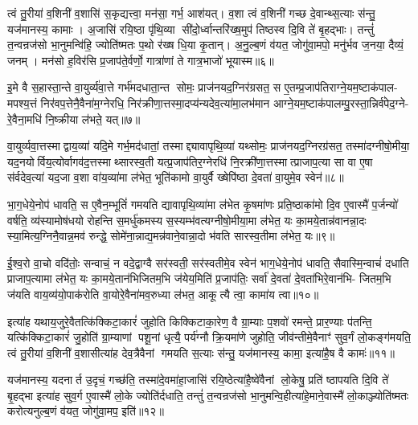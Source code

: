 त्वं तु॒रीया॑ व॒शिनी॑ व॒शासि॑ स॒कृद्यत्त्वा॒ मन॑सा॒ गर्भ॒ आश॑यत्। व॒शा त्वं व॒शिनी॑ गच्छ दे॒वान्थ्स॒त्याः स॑न्तु॒ यज॑मानस्य॒ कामाः। अ॒जासि॑ रयि॒ष्ठा पृ॑थि॒व्या सी॑दो॒र्ध्वान्तरि॑ख्ष॒मुप॑ तिष्ठस्व दि॒वि ते॑ बृ॒हद्भाः। तन्तुं॑ त॒न्वन्रज॑सो भा॒नुमन्वि॑हि॒ ज्योति॑ष्मतः प॒थो र॑ख्ष धि॒या कृ॒तान्। अ॒नु॒ल्ब॒णं व॑यत॒ जोगु॑वा॒मपो॒ मनु॑र्भव ज॒नया॒ दैव्यं॒ जनम्। मन॑सो ह॒विर॑सि प्र॒जाप॑ते॒र्वर्णो॒ गात्रा॑णां ते गात्र॒भाजो॑ भूयास्म॥६॥

{\anuvakamend[{सर॑स्वत्यै॒ स्वाहा॒ मनु॒स्त्रयो॑दश च॥२॥}]}

इ॒मे वै स॒हास्ता॒न्ते वा॒युर्व्य॑वा॒त्ते गर्भ॑मदधाता॒न्त सोमः॒ प्राज॑नयद॒ग्निर॑ग्रसत॒ स ए॒तम्प्र॒जाप॑तिराग्ने॒यम॒ष्टाक॑पाल- मपश्य॒त्तं निर॑वप॒त्तेनै॒वैना॑म॒ग्नेरधि॒ निर॑क्रीणा॒त्तस्मा॒दप्य॑न्यदेव॒त्या॑मा॒लभ॑मान आग्ने॒यम॒ष्टाक॑पालम्पु॒रस्ता॒न्निर्व॑पेद॒ग्ने- रे॒वैना॒मधि॑ नि॒ष्क्रीया ल॑भते॒ यत्॥७॥

वा॒युर्व्यवा॒त्तस्माद्वाय॒व्या॑ यदि॒मे गर्भ॒मद॑धातां॒ तस्माद्द्यावापृथि॒व्या॑ यथ्सोमः॒ प्राज॑नयद॒ग्निरग्र॑सत॒ तस्मा॑दग्नीषो॒मीया॒ यद॒नयोर्विय॒त्योर्वागव॑द॒त्तस्माथ्सारस्व॒ती यत्प्र॒जाप॑तिर॒ग्नेरधि॑ नि॒रक्री॑णा॒त्तस्मात्प्राजाप॒त्या सा वा ए॒षा स॑र्वदेव॒त्या॑ यद॒जा व॒शा वा॑य॒व्या॑मा ल॑भेत॒ भूति॑कामो वा॒युर्वै ख्षेपि॑ष्ठा दे॒वता॑ वा॒युमे॒व स्वेन॑॥८॥

भा॒ग॒धेये॒नोप॑ धावति॒ स ए॒वैन॒म्भूतिं॑ गमयति द्यावापृथि॒व्या॑मा ल॑भेत कृ॒षमा॑णः प्रति॒ष्ठाका॑मो दि॒व ए॒वास्मै॑ प॒र्जन्यो॑ वर्\mbox{}षति॒ व्य॑स्यामोष॑धयो रोहन्ति स॒मर्धु॑कमस्य स॒स्यम्भ॑वत्यग्नीषो॒मीया॒मा ल॑भेत॒ यः का॒मये॒तान्न॑वानन्ना॒दः स्या॒मित्य॒ग्निनै॒वान्न॒मव॑ रुन्द्धे॒ सोमे॑ना॒न्नाद्य॒मन्न॑वाने॒वान्ना॒दो भ॑वति सारस्व॒तीमा ल॑भेत॒ यः॥९॥

ई॒श्व॒रो वा॒चो वदि॑तोः॒ सन्वाचं॒ न वदे॒द्वाग्वै सर॑स्वती॒ सर॑स्वतीमे॒व स्वेन॑ भाग॒धेये॒नोप॑ धावति॒ सैवास्मि॒न्वाचं॑ दधाति प्राजाप॒त्यामा ल॑भेत॒ यः का॒मये॒तान॑भिजितम॒भि ज॑येय॒मिति॑ प्र॒जाप॑तिः॒ सर्वा॑ दे॒वता॑ दे॒वता॑भिरे॒वान॑भि- जितम॒भि ज॑यति वाय॒व्य॑यो॒पाक॑रोति वा॒योरे॒वैना॑मव॒रुध्या ल॑भत॒ आकूत्यै त्वा॒ कामा॑य त्वा॥१०॥

इत्या॑ह यथाय॒जुरे॒वैतत्कि॑क्किटा॒कारं॑ जुहोति किक्किटाका॒रेण॒ वै ग्रा॒म्याः प॒शवो॑ रमन्ते॒ प्रार॒ण्याः प॑तन्ति॒ यत्कि॑क्किटा॒कारं॑ जु॒होति॑ ग्रा॒म्याणां पशू॒नां धृत्यै॒ पर्य॑ग्नौ क्रि॒यमा॑णे जुहोति॒ जीव॑न्तीमे॒वैनाꣳ॑ सुव॒र्गं लो॒कङ्ग॑मयति॒ त्वं तु॒रीया॑ व॒शिनी॑ व॒शासीत्या॑ह देव॒त्रैवैनां गमयति स॒त्याः स॑न्तु॒ यज॑मानस्य॒ कामा॒ इत्या॑है॒ष वै कामः॑॥११॥

यज॑मानस्य॒ यदनार्त उ॒दृचं॒ गच्छ॑ति॒ तस्मा॑दे॒वमा॑हा॒जासि॑ रयि॒ष्ठेत्या॑है॒ष्वे॑वैनां लो॒केषु॒ प्रति॑ ष्ठापयति दि॒वि ते॑ बृ॒हद्भा इत्या॑ह सुव॒र्ग ए॒वास्मै॑ लो॒के ज्योति॑र्दधाति॒ तन्तुं॑ त॒न्वन्रज॑सो भा॒नुमन्वि॒हीत्या॑हे॒माने॒वास्मै॑ लो॒काञ्ज्योति॑ष्मतः करोत्यनुल्ब॒णं व॑यत॒ जोगु॑वा॒मप॒ इति॑॥१२॥

